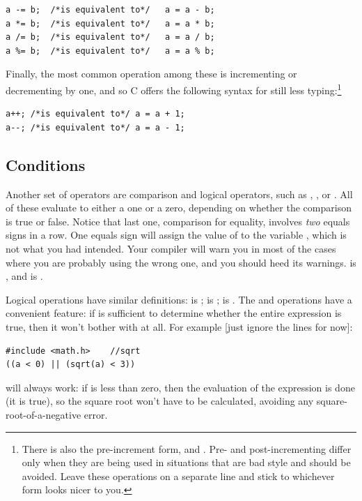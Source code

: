 \begin{lstlisting}
a -= b;  /*is equivalent to*/   a = a - b;
a *= b;  /*is equivalent to*/   a = a * b;
a /= b;  /*is equivalent to*/   a = a / b;
a %= b;  /*is equivalent to*/   a = a % b;
\end{lstlisting}

Finally, the most common operation among these is incrementing or decrementing by one, and so C offers the
following syntax for still less typing:\footnote{There is also the pre-increment form,  and
. Pre- and post-incrementing differ only when they are being used in situations that are bad style and should
be avoided. Leave these operations on a separate line and stick to whichever form looks nicer to you.} \\
\begin{lstlisting}
a++; /*is equivalent to*/ a = a + 1;
a--; /*is equivalent to*/ a = a - 1;
\end{lstlisting}



\subsection{Conditions} 	
\label{forloops}    
\ckeyind{<} \ckeyind{>} \ckeyind{==}
Another set of operators are comparison and logical operators, such as ,
, or . All of these evaluate to either a one or a zero, depending on whether the
comparison is true or false. Notice that last one, comparison for equality, involves {\sl two} equals
signs in a row. One equals sign  will assign the value of  to the variable , which is not what
you had intended. Your compiler will warn you in most of the cases where you are
probably using the wrong one, and you should heed its warnings.  is , and  is .

\ckeyind{\&\&}  
Logical operations have similar definitions: \ci{\&\&}  
  
 is ;  is ;  is .
The \ci{\&\&} and \ci{||} operations have a convenient feature: if  is sufficient to determine whether
the entire expression is true, then it won't bother with  at all. For example [just ignore the  lines for now]:
\begin{lstlisting}
#include <math.h>    //sqrt
((a < 0) || (sqrt(a) < 3))
\end{lstlisting}
will always work: if  is less than zero, then the evaluation
of the expression is done (it is true), so the square root won't have
to be calculated, avoiding any square-root-of-a-negative error. 

